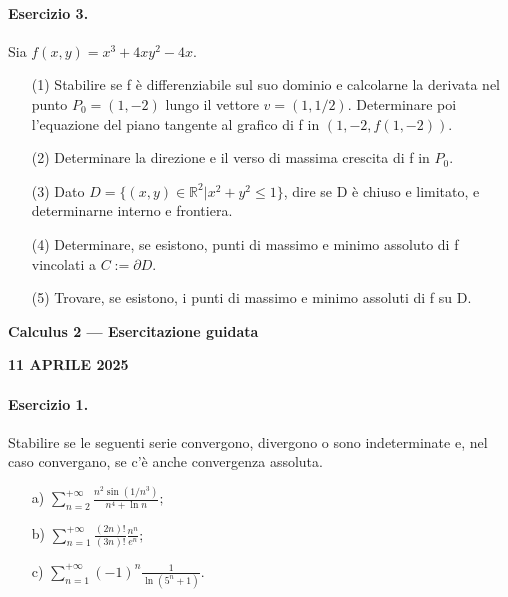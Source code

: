 \documentclass[a4paper, 10pt]{article}
\newcommand{\sectiontitle}[1]{\begin{center}\large\bfseries #1\end{center}}
\newcommand{\exercisecenter}[1]{\begin{center}\bfseries #1\end{center}}
\begin{document}
\paragraph{Esercizio 3.} Sia $f(x,y)=x^{3}+4xy^{2}-4x.$
\begin{enumerate}
    \item[(1)] Stabilire se f è differenziabile sul suo dominio e calcolarne la derivata nel punto $P_{0}=(1,-2)$ lungo il vettore $v=(1,1/2)$. Determinare poi l'equazione del piano tangente al grafico di f in $(1,-2,f(1,-2))$.
    \item[(2)] Determinare la direzione e il verso di massima crescita di f in $P_{0}$.
    \item[(3)] Dato $D=\{(x,y)\in\mathbb{R}^{2}|x^{2}+y^{2}\le1\}$, dire se D è chiuso e limitato, e determinarne interno e frontiera.
    \item[(4)] Determinare, se esistono, punti di massimo e minimo assoluto di f vincolati a $C:=\partial D$.
    \item[(5)] Trovare, se esistono, i punti di massimo e minimo assoluti di f su D.
\end{enumerate}

\newpage

\sectiontitle{Calculus 2 --- Esercitazione guidata}
\exercisecenter{11 APRILE 2025}

\paragraph{Esercizio 1.} Stabilire se le seguenti serie convergono, divergono o sono indeterminate e, nel caso convergano, se c'è anche convergenza assoluta.
\begin{enumerate}
    \item[a)] $\displaystyle \sum_{n=2}^{+\infty}\frac{n^{2}\sin(1/n^{3})}{n^{4}+\ln n};$
    \item[b)] $\displaystyle \sum_{n=1}^{+\infty}\frac{(2n)!}{(3n)!}\frac{n^{n}}{e^{n}};$
    \item[c)] $\displaystyle \sum_{n=1}^{+\infty}(-1)^{n}\frac{1}{\ln(5^{n}+1)}.$
\end{enumerate}
\end{document}
